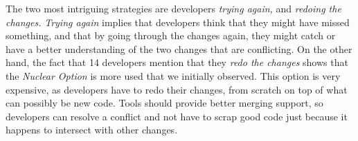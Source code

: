 The two most intriguing strategies are developers \emph{trying again,} and \emph{redoing the changes.}
\emph{Trying again} implies that developers think that they might have missed something, and that by going through the changes again, they might catch or have a better understanding of the two changes that are conflicting.
On the other hand, the fact that 14 developers mention that they \emph{redo the changes} shows that the \emph{Nuclear Option} is more used that we initially observed.
This option is very expensive, as developers have to redo their changes, from scratch on top of what can possibly be new code.
Tools should provide better merging support, so developers can resolve a conflict and not have to scrap good code just because it happens to intersect with other changes.

